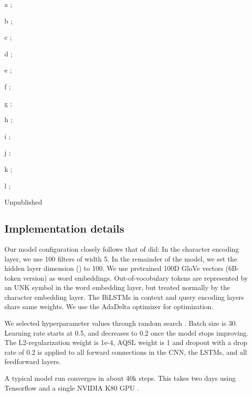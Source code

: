 \documentclass[11pt,letterpaper]{article}
\begin{document}
\begin{table}[t]
\begin{threeparttable}
\begin{tablenotes}
\item[a]\citet{Rajpurkar:2016vf};\item[b] \citet{Yu:2016vg};\item[c]\citet{Yang:2016vi};\item[d]\citet{Wang:2016ws};\item[e]\citet{Xiong:2016uq};\item[f]\citet{Seo:2016tp};\item[g]\citet{Lee:2016td};\item[h]\citet{Wang:2016vv};\item[i]\citet{Weissenborn:2017wa};\item[j]\citet{Document_reader2017arXiv170400051C}; \item[k]\citet{Shen:2016uu};\item[l]\citet{Zhang:2017wl};\item[]Unpublished
\end{tablenotes}
\end{threeparttable}
\renewcommand*{\thefootnote}{\arabic{footnote}}
\end{table}


\subsection{Implementation details}

Our model configuration closely follows that of \citet{Seo:2016tp} did: In the character encoding layer, we use 100 filters of width 5. In the remainder of the model, we set the hidden layer dimension () to 100. We use pretrained 100D GloVe vectors (6B-token version) as word embeddings. Out-of-vocobulary tokens are represented by an UNK symbol in the word embedding layer, but treated normally by the character embedding layer. The BiLSTMs in context and query encoding layers share same weights. We use the AdaDelta optimizer \cite{AdaDelta2012arXiv1212.5701Z} for optimization. 

We selected hyperparameter values through random search \cite{random_grid_search_Bergstra:2012ux}. Batch size is 30. Learning rate starts at 0.5, and decreases to 0.2 once the model stops improving. The L2-regularization weight is 1e-4, AQSL weight is 1 and dropout with a drop rate of 0.2 is applied to all forward connections in the CNN, the LSTMs, and all feedforward layers. 

A typical model run converges in about 40k steps. This takes two days using Tensorflow \cite{tensorflow2015-whitepaper} and a single NVIDIA K80 GPU .
\end{document}
